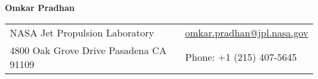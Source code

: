 \documentclass[letterpaper,12pt,oneside]{article}
\begin{document}
\begin{center}
\Large{\textbf{Omkar Pradhan}}  \\
\end{center}
\vspace*{-.5\baselineskip}

\normalsize


\begin{center}
\begin{tabular}{l l}
NASA Jet Propulsion Laboratory   & \hspace{0.5in} \href{mailto: omkar.pradhan@jpl.nasa.gov }{omkar.pradhan@jpl.nasa.gov} \\
4800 Oak Grove Drive
Pasadena CA 91109 & \hspace{0.5in} Phone: +1 (215) 407-5645   \\
\end{tabular}
\end{center}


\end{document}
